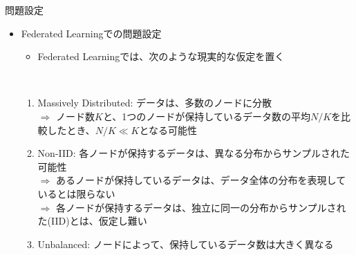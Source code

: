 \documentclass[dvipdfmx,notheorems,t]{beamer}
\begin{document}
\begin{frame}{問題設定}

\begin{itemize}
	\item Federated Learningでの問題設定
	\begin{itemize}
		\item Federated Learningでは、次のような現実的な仮定を置く
	\end{itemize} \
	
	\begin{enumerate}
		\item \alert{Massively Distributed}: データは、多数のノードに分散 \\
		$\Rightarrow$ ノード数$K$と、1つのノードが保持しているデータ数の平均$N / K$を比較したとき、\color{red}$N / K \ll K$\normalcolor となる可能性
		\newline
		
		\item \alert{Non-IID}: 各ノードが保持するデータは、異なる分布からサンプルされた可能性 \\
		$\Rightarrow$ あるノードが保持しているデータは、データ全体の分布を表現しているとは限らない \\
		$\Rightarrow$ 各ノードが保持するデータは、独立に同一の分布からサンプルされた(IID)とは、仮定し難い
		\newline
		
		\item \alert{Unbalanced}: ノードによって、保持しているデータ数は大きく異なる
	\end{enumerate}
\end{itemize}

\end{frame}
\end{document}
